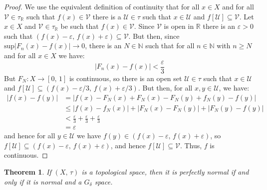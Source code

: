 \documentclass{article}
\theoremstyle{plain}
\newtheorem{theorem}{Theorem}[section]
\theoremstyle{normal}
\begin{document}
        \begin{proof}
            We use the equivalent definition of continuity that for all
            $x\in{X}$ and for all $\mathcal{V}\in\tau_{\mathbb{R}}$ such that
            $f(x)\in\mathcal{V}$ there is a $\mathcal{U}\in\tau$ such that
            $x\in\mathcal{U}$ and $f[\mathcal{U}]\subseteq\mathcal{V}$.
            Let $x\in{X}$ and $\mathcal{V}\in\tau_{\mathbb{R}}$ be such that
            $f(x)\in\mathcal{V}$. Since $\mathcal{V}$ is open in $\mathbb{R}$
            there is an $\varepsilon>0$ such that
            $(f(x)-\varepsilon,\,f(x)+\varepsilon)\subseteq\mathcal{V}$. But
            then, since $\textrm{sup}|F_{n}(x)-f(x)|\rightarrow{0}$, there is an
            $N\in\mathbb{N}$ such that for all $n\in\mathbb{N}$ with $n\geq{N}$
            and for all $x\in{X}$ we have:
            \begin{equation}
                |F_{n}(x)-f(x)|<\frac{\varepsilon}{3}
            \end{equation}
            But $F_{N}:X\rightarrow[0,\,1]$ is continuous, so there is an open
            set $\mathcal{U}\in\tau$ such that $x\in\mathcal{U}$ and
            $f[\mathcal{U}]\subseteq(f(x)-\varepsilon/3,\,f(x)+\varepsilon/3)$.
            But then, for all $x,y\in\mathcal{U}$, we have:
            \begin{align}
                |f(x)-f(y)|
                &=|f(x)-F_{N}(x)+F_{N}(x)-F_{N}(y)+f_{N}(y)-f(y)|\\
                &\leq|f(x)-f_{N}(x)|+|F_{N}(x)-F_{N}(y)|+|F_{N}(y)-f(y)|\\
                &<\frac{\varepsilon}{3}+\frac{\varepsilon}{3}
                    +\frac{\varepsilon}{3}\\
                &=\varepsilon
            \end{align}
            and hence for all $y\in\mathcal{U}$ we have
            $f(y)\in(f(x)-\varepsilon,\,f(x)+\varepsilon)$, so
            $f[\mathcal{U}]\subseteq(f(x)-\varepsilon,\,f(x)+\varepsilon)$, and
            hence $f[\mathcal{U}]\subseteq\mathcal{V}$. Thus, $f$ is continuous.
        \end{proof}
        \begin{theorem}
            If $(X,\,\tau)$ is a topological space, then it is perfectly normal
            if and only if it is normal and a $G_{\delta}$ space.
        \end{theorem}
\end{document}
